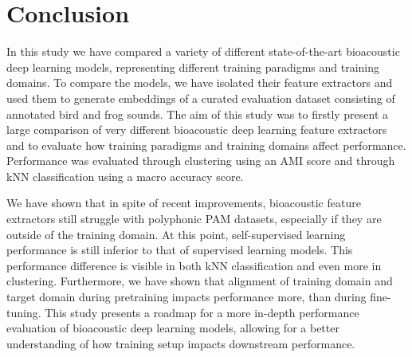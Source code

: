 \section{Conclusion}
\label{sec:conslusion}

In this study we have compared a variety of different state-of-the-art bioacoustic deep learning models, representing different training paradigms and training domains.
To compare the models, we have isolated their feature extractors and used them to generate embeddings of a curated evaluation dataset consisting of annotated bird and frog sounds.
The aim of this study was to firstly present a large comparison of very different bioacoustic deep learning feature extractors and to evaluate how training paradigms and training domains affect performance.
Performance was evaluated through clustering using an AMI score and through kNN classification using a macro accuracy score.

We have shown that in spite of recent improvements, bioacoustic feature extractors still struggle with polyphonic PAM datasets, especially if they are outside of the training domain.
At this point, self-supervised learning performance is still inferior to that of supervised learning models.
This performance difference is visible in both kNN classification and even more in clustering.
Furthermore, we have shown that alignment of training domain and target domain during pretraining impacts performance more, than during fine-tuning.
This study presents a roadmap for a more in-depth performance evaluation of bioacoustic deep learning models, allowing for a better understanding of how training setup impacts downstream performance.